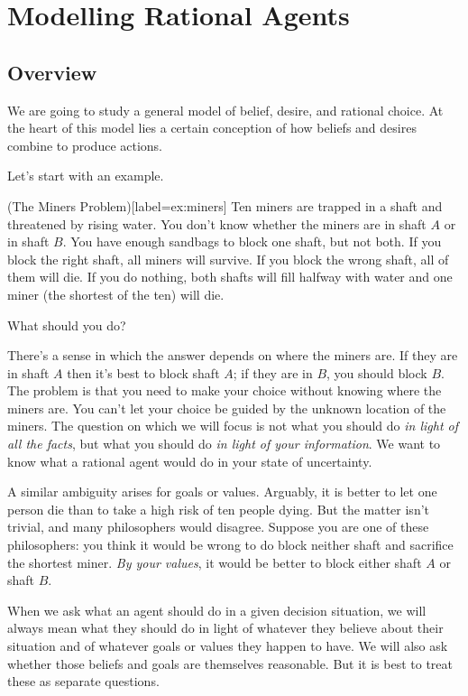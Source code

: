 \chapter{Modelling Rational Agents}\label{ch:overview}

\section{Overview}

We are going to study a general model of belief, desire, and rational choice. At
the heart of this model lies a certain conception of how beliefs and desires
combine to produce actions.

Let's start with an example.
%
\begin{example}(The Miners Problem)[label=ex:miners]
  Ten miners are trapped in a shaft and threatened by rising water. You don't
  know whether the miners are in shaft $A$ or in shaft $B$. You have enough
  sandbags to block one shaft, but not both. If you block the right shaft, all
  miners will survive. If you block the wrong shaft, all of them will die. If
  you do nothing, both shafts will fill halfway with water and one miner (the
  shortest of the ten) will die.
\end{example}

What should you do?

There's a sense in which the answer depends on where the miners are. If they are
in shaft $A$ then it's best to block shaft $A$; if they are in $B$, you should block
$B$. The problem is that you need to make your choice without knowing where the
miners are. You can't let your choice be guided by the unknown location of the
miners. The question on which we will focus is not what you should do \emph{in
  light of all the facts}, but what you should do \emph{in light of your
  information}. We want to know what a rational agent would do in your state of
uncertainty.

A similar ambiguity arises for goals or values. Arguably, it is better to let
one person die than to take a high risk of ten people dying. But the matter
isn't trivial, and many philosophers would disagree. Suppose you are one of
these philosophers: you think it would be wrong to do block neither shaft and
sacrifice the shortest miner. \emph{By your values}, it would be better to block
either shaft $A$ or shaft $B$.

When we ask what an agent should do in a given decision situation, we will always
mean what they should do in light of whatever they believe about their situation
and of whatever goals or values they happen to have. We will also ask whether
those beliefs and goals are themselves reasonable. But it is best to treat these
as separate questions.

